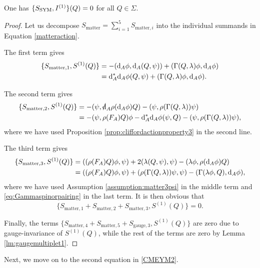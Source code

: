 \documentclass[10pt, oneside]{article}
\newcommand{\gauge}{\mathrm{gauge}}
\newcommand{\matter}{\mathrm{matter}}
\begin{document}
\begin{lemma} \label{lem:YM1}
One has $\{S_{\rm SYM}, I^{(1)}\} (Q) = 0$ for all $Q \in \Sigma$. 
\end{lemma}
\begin{proof}
Let us decompose $S_{\matter}=\sum_{i=1}^5 S_{\matter, i}$ into the individual summands in Equation \eqref{matteraction}. 

The first term gives
\begin{align*}
\{S_{\matter,1}, S^{(1)}(Q)\} &= -(\d_A\phi, \d_A(Q, \psi)) + (\Gamma(Q, \lambda)\phi, \d_A\phi) \\
&= \d_A^* \d_A\phi (Q, \psi) + (\Gamma(Q, \lambda)\phi, \d_A\phi).
\end{align*}

The second term gives
\begin{align*}
\{S_{\matter,2}, S^{(1)}(Q)\} &= -(\psi, \sd \d_A \rho(\d_A \phi) Q) - (\psi, \rho(\Gamma(Q, \lambda))\psi) \\
&= -(\psi, \rho(F_A) Q)\phi - \d_A^*\d_A \phi(\psi, Q) - (\psi, \rho(\Gamma(Q, \lambda))\psi),
\end{align*}
where we have used Proposition \ref{prop:cliffordactionproperty3} in the second line.

The third term gives
\begin{align*}
\{S_{\matter,3}, S^{(1)}(Q)\} &= ((\rho(F_A)Q) \phi, \psi) + 2(\lambda(Q, \psi), \psi) - (\lambda\phi, \rho(\d_A \phi) Q) \\
&= ((\rho(F_A)Q) \phi, \psi) + (\rho(\Gamma(Q, \lambda))\psi, \psi) - (\Gamma(\lambda\phi, Q), \d_A \phi),
\end{align*}
where we have used Assumption \ref{assumption:matter3psi} in the middle term and \eqref{eq:Gammaspinorpairing} in the last term. It is then obvious that
\[\{S_{\matter,1} + S_{\matter,2} + S_{\matter,3}, S^{(1)}(Q)\} = 0.\]

Finally, the terms $\{S_{\matter,4} + S_{\matter,5} + S_{\gauge,3}, S^{(1)}(Q)\}$ are zero due to gauge-invariance of $S^{(1)}(Q)$, while the rest of the terms are zero by Lemma \ref{lm:gaugemultiplet1}.
\end{proof}

Next, we move on to the second equation in \eqref{CMEYM2}.
\end{document}
